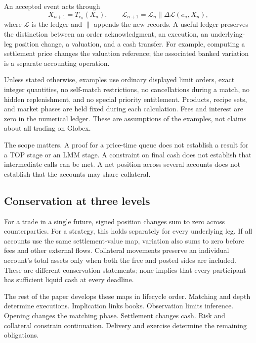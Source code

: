An accepted event acts through
\begin{equation}
 X_{n+1}=T_{e_n}(X_n),\qquad
 \mathcal L_{n+1}=\mathcal L_n\mathbin{\|}\Delta\mathcal L(e_n,X_n),
\end{equation}
where $\mathcal L$ is the ledger and $\|$ appends the new records. A useful ledger preserves the distinction between an order acknowledgment, an execution, an underlying-leg position change, a valuation, and a cash transfer. For example, computing a settlement price changes the valuation reference; the associated banked variation is a separate accounting operation.

\begin{assumption}\label{ass:scope}
Unless stated otherwise, examples use ordinary displayed limit orders, exact integer quantities, no self-match restrictions, no cancellations during a match, no hidden replenishment, and no special priority entitlement. Products, recipe sets, and market phases are held fixed during each calculation. Fees and interest are zero in the numerical ledger. These are assumptions of the examples, not claims about all trading on Globex.
\end{assumption}

The scope matters. A proof for a price-time queue does not establish a result for a TOP stage or an LMM stage. A constraint on final cash does not establish that intermediate calls can be met. A net position across several accounts does not establish that the accounts may share collateral.

\subsection{Conservation at three levels}

For a trade in a single future, signed position changes sum to zero across counterparties. For a strategy, this holds separately for every underlying leg. If all accounts use the same settlement-value map, variation also sums to zero before fees and other external flows. Collateral movements preserve an individual account's total assets only when both the free and posted sides are included. These are different conservation statements; none implies that every participant has sufficient liquid cash at every deadline.

The rest of the paper develops these maps in lifecycle order. Matching and depth determine executions. Implication links books. Observation limits inference. Opening changes the matching phase. Settlement changes cash. Risk and collateral constrain continuation. Delivery and exercise determine the remaining obligations.
\FloatBarrier
